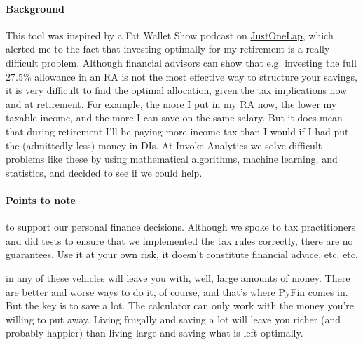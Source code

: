 \documentclass[a4paper, justified]{tufte-handout}
\begin{document}
\paragraph{Background} This tool was inspired by a Fat Wallet Show podcast on \href{https://justonelap.com/podcast-can-one-etf-rule/}{JustOneLap}, which alerted me to the fact that investing optimally for my retirement is a really difficult problem. Although financial advisors can show that e.g. investing the full 27.5\% allowance in an RA is not the most effective way to structure your savings, it is very difficult to find the optimal allocation, given the tax implications now and at retirement. For example, the more I put in my RA now, the lower my taxable income, and the more I can save on the same salary. But it does mean that during retirement I'll be paying more income tax than I would if I had put the (admittedly less) money in DIs.
At Invoke Analytics we solve difficult problems like these by using mathematical algorithms, machine learning, and statistics, and decided to see if we could help. 

\paragraph{Points to note}  to support our personal finance decisions. Although we spoke to tax practitioners and did tests to ensure that we implemented the tax rules correctly, there are no guarantees. Use it at your own risk, it doesn't constitute financial advice, etc. etc.

 in any of these vehicles will leave you with, well, large amounts of money. There are better and worse ways to do it, of course, and that's where PyFin comes in. But the key is to save a lot. The calculator can only work with the money you're willing to put away. Living frugally and saving a lot will leave you richer (and probably happier) than living large and saving what is left optimally.
\end{document}
